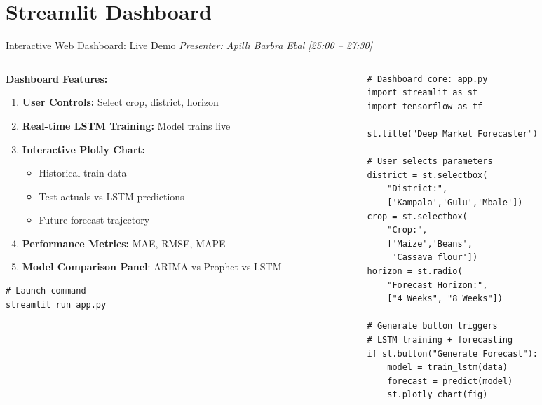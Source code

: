 \documentclass[aspectratio=169,11pt]{beamer}
\begin{document}
\section{Streamlit Dashboard}

\begin{frame}[fragile]{Interactive Web Dashboard: Live Demo}
\textit{\small Presenter: Apilli Barbra Ebal \hfill [25:00 -- 27:30]}
\begin{columns}
\begin{column}{0.55\textwidth}
\textbf{Dashboard Features:}
\begin{enumerate}
    \item \textbf{User Controls:} Select crop, district, horizon
    \item \textbf{Real-time LSTM Training:} Model trains live
    \item \textbf{Interactive Plotly Chart:}
    \begin{itemize}
        \item Historical train data
        \item Test actuals vs LSTM predictions
        \item Future forecast trajectory
    \end{itemize}
    \item \textbf{Performance Metrics:} MAE, RMSE, MAPE
    \item \textbf{Model Comparison Panel}: ARIMA vs Prophet vs LSTM
\end{enumerate}

\vspace{0.5em}
\begin{lstlisting}
# Launch command
streamlit run app.py
\end{lstlisting}
\end{column}
\begin{column}{0.42\textwidth}
\begin{lstlisting}
# Dashboard core: app.py
import streamlit as st
import tensorflow as tf

st.title("Deep Market Forecaster")

# User selects parameters
district = st.selectbox(
    "District:",
    ['Kampala','Gulu','Mbale'])
crop = st.selectbox(
    "Crop:",
    ['Maize','Beans',
     'Cassava flour'])
horizon = st.radio(
    "Forecast Horizon:",
    ["4 Weeks", "8 Weeks"])

# Generate button triggers
# LSTM training + forecasting
if st.button("Generate Forecast"):
    model = train_lstm(data)
    forecast = predict(model)
    st.plotly_chart(fig)
\end{lstlisting}
\end{column}
\end{columns}
\end{frame}
\end{document}
